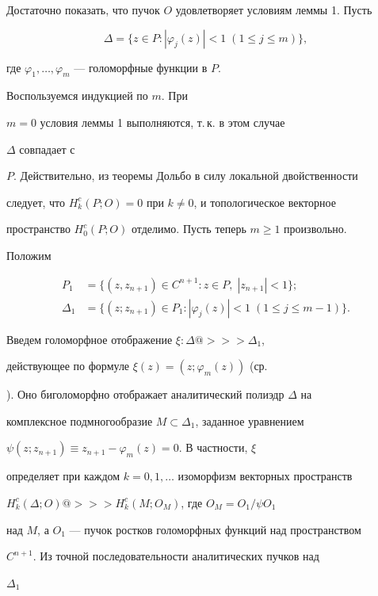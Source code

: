\begin{pf} 


Достаточно показать, что пучок $O$ удовлетворяет условиям леммы 1. Пусть 


$$ 


\Delta=\{z\in P:|\varphi_j(z)|<1\;(1\le j\le m)\}, 


$$ 


где $\varphi_1,\dotsc,\varphi_m$ --- голоморфные функции в $P$. 


Воспользуемся индукцией по $m$. При 


$m=0$ условия леммы 1 выполняются, т.\,к.{} в этом случае 


$\Delta$ совпадает с 


$P$. Действительно, из теоремы Дольбо в силу локальной двойственности 


следует, что $H^c_k(P;O)=0$ при $k\ne 0$, и топологическое векторное 


пространство $H^c_0(P;O)$ отделимо. Пусть теперь $m\ge 1$ произвольно. 


Положим 


\begin{align*} 


P_1&=\{(z,z_{n+1})\in C^{n+1}:z\in P,\;|z_{n+1}|<1\};\\ 


\Delta_1&=\{(z;z_{n+1})\in P_1:|\varphi_j(z)|<1\; 


(1\le j\le m-1)\}. 


\end{align*} 


Введем голоморфное отображение $\xi:\Delta@>>>\Delta_1$, 


действующее по формуле $\xi(z)=(z;\varphi_m(z))$ (ср. 


\cite{3}). Оно биголоморфно отображает аналитический полиэдр $\Delta$ на 


комплексное подмногообразие $M\subset\Delta_1$, заданное уравнением 


$\psi(z;z_{n+1})\equiv z_{n+1}-\varphi_m(z)=0$. В частности, $\xi$ 


определяет при каждом $k=0,1,\dotsc$ изоморфизм векторных пространств 


$H^c_k(\Delta;O)@>>>H^c_k(M;O_M)$, где $O_M=O_1/\psi O_1$ 


над $M$, а $O_1$ --- пучок ростков голоморфных функций над пространством 


$C^{n+1}$. Из точной последовательности аналитических пучков над 


$\Delta_1$ 



\end{pf}
